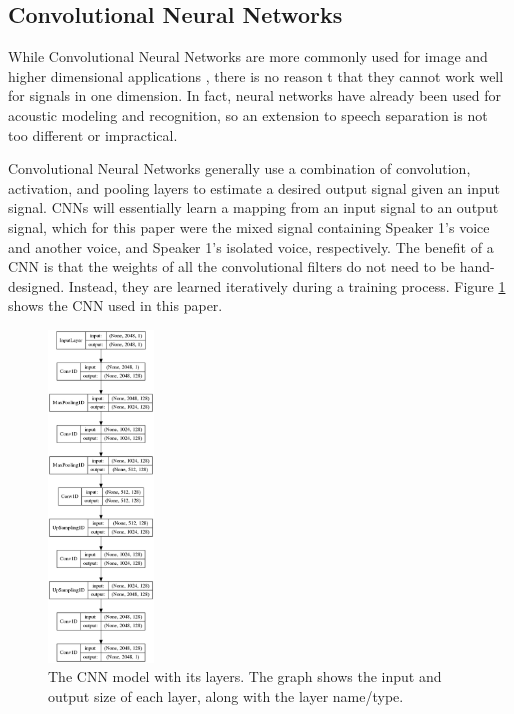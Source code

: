 \documentclass[12pt,chapterheads]{ucsd}
\begin{document}
\subsection{Convolutional Neural Networks}
While Convolutional Neural Networks are more commonly used for image and higher dimensional applications \cite{NIPS2012_4824}, there is no reason t that they cannot work well for signals in one dimension. In fact, neural networks have already been used for acoustic modeling and recognition\cite{6296526}, so an extension to speech separation is not too different or impractical.

Convolutional Neural Networks generally use a combination of convolution, activation, and pooling layers to estimate a desired output signal given an input signal. CNNs will essentially learn a mapping from an input signal to an output signal, which for this paper were the mixed signal containing Speaker 1's voice and another voice, and Speaker 1's isolated voice, respectively. The benefit of a CNN is that the weights of all the convolutional filters do not need to be hand-designed. Instead, they are learned iteratively during a training process. Figure \ref{fig:cnn_model} shows the CNN used in this paper.

\begin{figure}[h] 
  \centering
  \includegraphics[width=0.25\textwidth]{pics/model}
  \caption[The CNN model and its layers]
{The CNN model with its layers. The graph shows the input and output size of each layer, along with the layer name/type.}
  \label{fig:cnn_model}
\end{figure}
\end{document}
